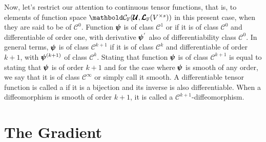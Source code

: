Now, let's restrict our attention to continuous tensor functions, that is, to elements of function space $\evc{\cam{F}}{\pmb{\mathcal{U}}}{\ete{\cam{F}}{V^{\times s}}}$ in this present case, when they are said to be of  $\mathcal{C}^0$. Function $\pmb{\psi}$ is of class $\mathcal{C}^1$ or  if it is of class $\mathcal{C}^0$ and differentiable of order one, with derivative $\pmb{\psi}^{'}$ also of differentiability class $\mathcal{C}^0$. In general terms, $\pmb{\psi}$ is of class $\mathcal{C}^{k+1}$ if it is of class $\mathcal{C}^{k}$ and differentiable of order $k+1$, with $\pmb{\psi}^{(k+1)}$ of class $\mathcal{C}^k$. Stating that function $\pmb{\psi}$ is of class $\mathcal{C}^{k+1}$ is equal to stating that $\pmb{\psi}$ is  of order $k+1$ and for the case where $\pmb{\psi}$ is smooth of any order, we say that it is of class $\mathcal{C}^\infty$ or simply call it smooth. A differentiable tensor function is called a  if it is a bijection and its inverse is also differentiable. When a diffeomorphism is smooth of order $k+1$, it is called a $\mathcal{C}^{k+1}$-diffeomorphism.





\section{The Gradient}

